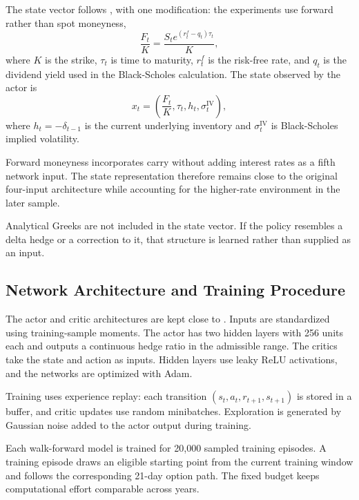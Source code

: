 \documentclass[a4paper,12pt]{article}
\numberwithin{equation}{section}
\begin{document}
The state vector follows \citet{mikkila2023empirical}, with one modification: the experiments use forward rather than spot moneyness,
\begin{equation}
    \frac{F_t}{K}
    =
    \frac{S_t e^{(r^f_t-q_t)\tau_t}}{K},
    \label{eq:forward_moneyness}
\end{equation}
where $K$ is the strike, $\tau_t$ is time to maturity, $r^f_t$ is the risk-free rate, and $q_t$ is the dividend yield used in the Black-Scholes calculation. The state observed by the actor is
\begin{equation}
    x_t
    =
    \left(
        \frac{F_t}{K},
        \tau_t,
        h_t,
        \sigma^{\mathrm{IV}}_t
    \right),
    \label{eq:state_vector}
\end{equation}
where $h_t=-\delta_{t-1}$ is the current underlying inventory and $\sigma^{\mathrm{IV}}_t$ is Black-Scholes implied volatility.

Forward moneyness incorporates carry without adding interest rates as a fifth network input. The state representation therefore remains close to the original four-input architecture while accounting for the higher-rate environment in the later sample.

Analytical Greeks are not included in the state vector. If the policy resembles a delta hedge or a correction to it, that structure is learned rather than supplied as an input.

\subsection{Network Architecture and Training Procedure}

The actor and critic architectures are kept close to \citet{mikkila2023empirical}. Inputs are standardized using training-sample moments. The actor has two hidden layers with 256 units each and outputs a continuous hedge ratio in the admissible range. The critics take the state and action as inputs. Hidden layers use leaky ReLU activations, and the networks are optimized with Adam.

Training uses experience replay: each transition $(s_t,a_t,r_{t+1},s_{t+1})$ is stored in a buffer, and critic updates use random minibatches. Exploration is generated by Gaussian noise added to the actor output during training.

Each walk-forward model is trained for 20,000 sampled training episodes. A training episode draws an eligible starting point from the current training window and follows the corresponding 21-day option path. The fixed budget keeps computational effort comparable across years.
\end{document}
